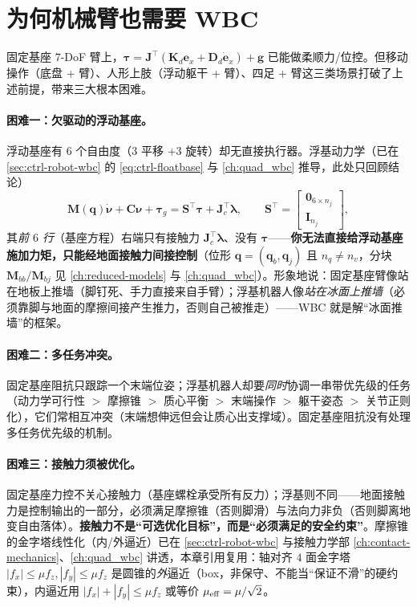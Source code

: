 \section{为何机械臂也需要 WBC}
\label{sec:fw-why-wbc}

固定基座 $7$-DoF 臂上，$\boldsymbol{\tau}=\mathbf{J}^\top(\mathbf{K}_d\mathbf{e}_x+\mathbf{D}_d\dot{\mathbf{e}}_x)+\mathbf{g}$ 已能做柔顺力/位控。但移动操作（底盘 + 臂）、人形上肢（浮动躯干 + 臂）、四足 + 臂这三类场景打破了上述前提，带来三大根本困难。

\paragraph{困难一：欠驱动的浮动基座。}
浮动基座有 $6$ 个自由度（$3$ 平移 $+3$ 旋转）却无直接执行器。浮基动力学（已在 \cref{sec:ctrl-robot-wbc} 的 \cref{eq:ctrl-floatbase} 与 \cref{ch:quad_wbc} 推导，此处只回顾结论）
\begin{equation}
  \mathbf{M}(\mathbf{q})\dot{\boldsymbol{\nu}}+\mathbf{C}\boldsymbol{\nu}+\boldsymbol{\tau}_g=\mathbf{S}^\top\boldsymbol{\tau}+\mathbf{J}_c^\top\boldsymbol{\lambda},\qquad
  \mathbf{S}^\top=\begin{bmatrix}\mathbf{0}_{6\times n_j}\\ \mathbf{I}_{n_j}\end{bmatrix},
  \label{eq:fw-floatbase}
\end{equation}
其\emph{前 $6$ 行}（基座方程）右端只有接触力 $\mathbf{J}_c^\top\boldsymbol{\lambda}$、没有 $\boldsymbol{\tau}$——\textbf{你无法直接给浮动基座施加力矩，只能经地面接触力间接控制}（位形 $\mathbf{q}=(\mathbf{q}_b,\mathbf{q}_j)$ 且 $n_q\neq n_v$，分块 $\mathbf{M}_{bb}/\mathbf{M}_{bj}$ 见 \cref{ch:reduced-models} 与 \cref{ch:quad_wbc}）。形象地说：固定基座臂像站在地板上推墙（脚钉死、手力直接来自手臂）；浮基机器人像\emph{站在冰面上推墙}（必须靠脚与地面的摩擦间接产生推力，否则自己被推走）——WBC 就是解“冰面推墙”的框架。

\paragraph{困难二：多任务冲突。}
固定基座阻抗只跟踪一个末端位姿；浮基机器人却要\emph{同时}协调一串带优先级的任务（动力学可行性 $>$ 摩擦锥 $>$ 质心平衡 $>$ 末端操作 $>$ 躯干姿态 $>$ 关节正则化），它们常相互冲突（末端想伸远但会让质心出支撑域）。固定基座阻抗没有处理多任务优先级的机制。

\paragraph{困难三：接触力须被优化。}
固定基座力控不关心接触力（基座螺栓承受所有反力）；浮基则不同——地面接触力是控制输出的一部分，必须满足摩擦锥（否则脚滑）与法向力非负（否则脚离地变自由落体）。\textbf{接触力不是“可选优化目标”，而是“必须满足的安全约束”}。摩擦锥的金字塔线性化（内/外逼近）已在 \cref{sec:ctrl-robot-wbc} 与接触力学部 \cref{ch:contact-mechanics}、\cref{ch:quad_wbc} 讲透，本章引用复用：轴对齐 $4$ 面金字塔 $|f_x|\le\mu f_z,|f_y|\le\mu f_z$ 是圆锥的\emph{外}逼近（box，非保守、不能当“保证不滑”的硬约束），内逼近用 $|f_x|+|f_y|\le\mu f_z$ 或等价 $\mu_{\rm eff}=\mu/\sqrt2$。

